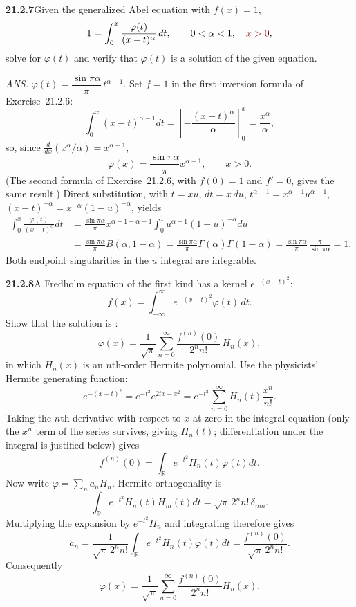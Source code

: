 \par\bigskip
\noindent\textbf{21.2.7}\quad Given the generalized Abel equation
with $f(x)=1$,
\[
1=\int_{0}^{x}\frac{\varphi(t)}{(x-t)^{\alpha}}\,dt,
\qquad0<\alpha<1,\quad\erratum{x>0},
\]
solve for $\varphi(t)$ and verify that $\varphi(t)$ is a solution
of the given equation.
\par\nobreak\hfill\emph{ANS.}\enspace
$\varphi(t)=\dfrac{\sin\pi\alpha}{\pi}\,t^{\alpha-1}$.
\solution
Set $f=1$ in the first inversion formula of Exercise~21.2.6:
\[
\int_0^x(x-t)^{\alpha-1}dt=\left[-\frac{(x-t)^\alpha}{\alpha}\right]_0^x
=\frac{x^\alpha}{\alpha},
\]
so, since $\frac{d}{dx}(x^\alpha/\alpha)=x^{\alpha-1}$,
\[
\boxed{\varphi(x)=\frac{\sin\pi\alpha}{\pi}x^{\alpha-1}},
\qquad x>0.
\]
(The second formula of Exercise~21.2.6, with $f(0)=1$ and $f'=0$, gives
the same result.) Direct substitution, with $t=xu$, $dt=x\,du$,
$t^{\alpha-1}=x^{\alpha-1}u^{\alpha-1}$, $(x-t)^{-\alpha}=x^{-\alpha}(1-u)^{-\alpha}$,
yields
\[
\begin{aligned}
\int_0^x\frac{\varphi(t)}{(x-t)^\alpha}dt
&=\frac{\sin\pi\alpha}{\pi}
x^{\alpha-1-\alpha+1}
\int_0^1u^{\alpha-1}(1-u)^{-\alpha}du\\
&=\frac{\sin\pi\alpha}{\pi}B(\alpha,1-\alpha)
=\frac{\sin\pi\alpha}{\pi}
\Gamma(\alpha)\Gamma(1-\alpha)
=\frac{\sin\pi\alpha}{\pi}\,\frac{\pi}{\sin\pi\alpha}=1.
\end{aligned}
\]
Both endpoint singularities in the $u$ integral are integrable.


\par\bigskip
\noindent\textbf{21.2.8}\quad A Fredholm equation of the first
kind has a kernel $e^{-(x-t)^{2}}$:
\[
f(x)=\int_{-\infty}^{\infty}e^{-(x-t)^{2}}\varphi(t)\,dt.
\]
 Show that the solution is
:
\[
\varphi(x)=\frac{1}{\sqrt{\pi}}\sum_{n=0}^{\infty}
\frac{f^{(n)}(0)}{2^{n}n!}\,H_{n}(x),
\]
in which $H_{n}(x)$ is an $n$th-order Hermite polynomial.
\solution
Use the physicists' Hermite generating function:
\[
e^{-(x-t)^2}=e^{-t^2}e^{2tx-x^2}
=e^{-t^2}\sum_{n=0}^\infty H_n(t)\frac{x^n}{n!}.
\]
Taking the $n$th derivative with respect to $x$ at zero in the
integral equation (only the $x^n$ term of the series survives, giving
$H_n(t)$; differentiation under the integral is justified below) gives
\[
f^{(n)}(0)=\int_{\mathbb R}e^{-t^2}H_n(t)\varphi(t)dt.
\]
Now write $\varphi=\sum_n a_nH_n$. Hermite orthogonality is
\[
\int_{\mathbb R}e^{-t^2}H_n(t)H_m(t)dt
=\sqrt\pi\,2^nn!\,\delta_{nm}.
\]
Multiplying the expansion by $e^{-t^2}H_n$ and integrating therefore
gives
\[
a_n=\frac{1}{\sqrt\pi\,2^nn!}
\int_{\mathbb R}e^{-t^2}H_n(t)\varphi(t)dt
=\frac{f^{(n)}(0)}{\sqrt\pi\,2^nn!}.
\]
Consequently
\[
\boxed{\varphi(x)=\frac1{\sqrt\pi}\sum_{n=0}^\infty
\frac{f^{(n)}(0)}{2^nn!}H_n(x)}.
\]

